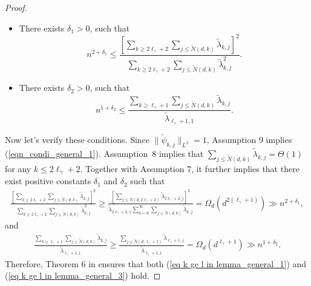\documentclass{article}
\theoremstyle{plain}
\theoremstyle{definition}
\theoremstyle{remark}
\newcommand{\green}{\color{green}}
\newcommand{\dhnote}[1]{{\color{red}[#1]} } %
\begin{document}
\begin{appendix}
\begin{proof}
\begin{itemize}
    \item There exists $\delta_1>0$, such that
 \begin{equation}\label{eqn_condi_general_2}
    n^{2+\delta_1} \leq \frac{\left[\sum_{k \geq 2\ell_{\gamma}+2} \sum_{j \leq \tilde{N}(d, k)} \tilde{\lambda}_{k, j} \right]^2}{\sum_{k \geq 2\ell_{\gamma}+2} \sum_{j \leq \tilde{N}(d, k)} \tilde{\lambda}_{k, j}^2 }.
    \end{equation}

    \item There exists $\delta_2>0$, such that
\begin{equation}\label{eqn_condi_general_3}
    n^{1+\delta_2} \leq \frac{\sum_{k \geq \ell_{\gamma}+1} \sum_{j \leq \tilde{N}(d, k)} \tilde{\lambda}_{k, j} }{\tilde{\lambda}_{\ell_{\gamma}+1, 1}}.
    \end{equation}

\end{itemize}

Now let's verify these conditions. Since $\|\tilde{\psi}_{k, j}\|_{L^{2}}=1$, Assumption 9 implies (\ref{eqn_condi_general_1}). 
Assumption~8 implies that $\sum_{j \leq \tilde{N}(d, k)} \tilde{\lambda}_{k, j} =\Theta(1)$ for any $k\leq 2\ell_{\gamma}+2$. 
Together with Assumption 7, it further implies that there exist positive constants $\delta_1$ and $\delta_2$ such that
\begin{align*}
    \frac{\left[\sum_{k \geq 2\ell_{\gamma}+2} \sum_{j \leq \tilde{N}(d, k)} \tilde{\lambda}_{k, j} \right]^2}{\sum_{k \geq 2\ell_{\gamma}+2} \sum_{j \leq \tilde{N}(d, k)} \tilde{\lambda}_{k, j}^2 } \geq \frac{\left[\sum_{j \leq \tilde{N}(d, 2\ell_{\gamma}+2)} \tilde{\lambda}_{2\ell_{\gamma}+2, j} \right]^2}{\tilde{\lambda}_{2\ell_{\gamma}+2, 1}\sum_{k = 0}^{\infty} \sum_{j \leq \tilde{N}(d, k)} \tilde{\lambda}_{k, j}} = \Omega_d(d^{2(\ell_{\gamma}+1)}) \gg n^{2+\delta_1},
\end{align*}
and
\begin{align*}
    \frac{\sum_{k \geq \ell_{\gamma}+1} \sum_{j \leq \tilde{N}(d, k)} \tilde{\lambda}_{k, j} }{\tilde{\lambda}_{\ell_{\gamma}+1, 1}} \geq \frac{\sum_{j \leq \tilde{N}(d, \ell_{\gamma}+1)} \tilde{\lambda}_{\ell_{\gamma}+1, j} }{\tilde{\lambda}_{\ell_{\gamma}+1, 1}}
    = \Omega_d(d^{\ell_{\gamma}+1}) \gg n^{1+\delta_2}.
\end{align*}
Therefore, Theorem 6 in \cite{mei2022generalization} ensures that both (\ref{eq k ge l in lemma_general_1}) and (\ref{eq k ge l in lemma_general_3}) hold.


\end{proof}
\end{appendix}
\end{document}
